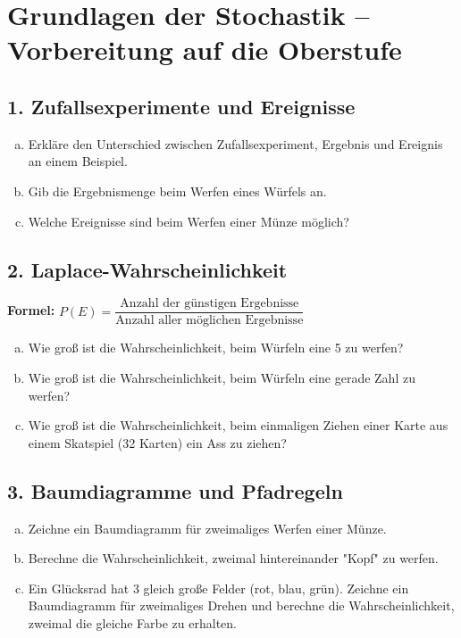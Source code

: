 
\section*{Grundlagen der Stochastik – Vorbereitung auf die Oberstufe}

\subsection*{1. Zufallsexperimente und Ereignisse}
\begin{enumerate}[a)]
    \item Erkläre den Unterschied zwischen Zufallsexperiment, Ergebnis und Ereignis an einem Beispiel.
    \item Gib die Ergebnismenge beim Werfen eines Würfels an.
    \item Welche Ereignisse sind beim Werfen einer Münze möglich?
\end{enumerate}

\subsection*{2. Laplace-Wahrscheinlichkeit}
\textbf{Formel:} $P(E) = \dfrac{\text{Anzahl der günstigen Ergebnisse}}{\text{Anzahl aller möglichen Ergebnisse}}$

\begin{enumerate}[a)]
    \item Wie groß ist die Wahrscheinlichkeit, beim Würfeln eine 5 zu werfen?
    \item Wie groß ist die Wahrscheinlichkeit, beim Würfeln eine gerade Zahl zu werfen?
    \item Wie groß ist die Wahrscheinlichkeit, beim einmaligen Ziehen einer Karte aus einem Skatspiel (32 Karten) ein Ass zu ziehen?
\end{enumerate}

\subsection*{3. Baumdiagramme und Pfadregeln}
\begin{enumerate}[a)]
    \item Zeichne ein Baumdiagramm für zweimaliges Werfen einer Münze.
    \item Berechne die Wahrscheinlichkeit, zweimal hintereinander "Kopf" zu werfen.
    \item Ein Glücksrad hat 3 gleich große Felder (rot, blau, grün). Zeichne ein Baumdiagramm für zweimaliges Drehen und berechne die Wahrscheinlichkeit, zweimal die gleiche Farbe zu erhalten.
\end{enumerate}

